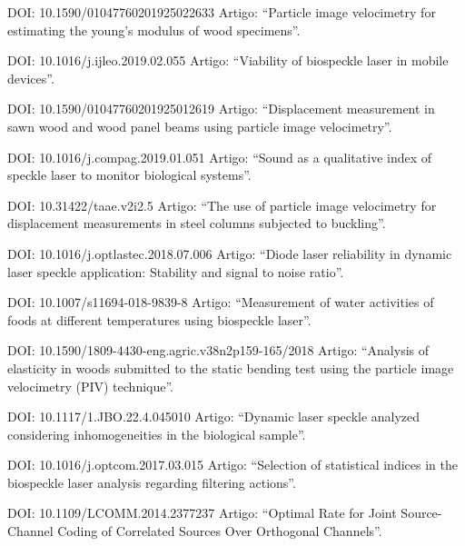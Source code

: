 \documentclass[11pt,a4paper,sans]{moderncv} %
\begin{document}
	      {DOI: 10.1590/01047760201925022633}{}{}
	      {Artigo: ``Particle image velocimetry for estimating the young’s modulus of wood specimens''.}

	      {DOI: 10.1016/j.ijleo.2019.02.055}{}{}
	      {Artigo: ``Viability of biospeckle laser in mobile devices''.}

	      {DOI: 10.1590/01047760201925012619}{}{}
	      {Artigo: ``Displacement measurement in sawn wood and wood panel beams using particle image velocimetry''.}

	      {DOI: 10.1016/j.compag.2019.01.051}{}{}
	      {Artigo: ``Sound as a qualitative index of speckle laser to monitor biological systems''.}

	      {DOI: 10.31422/taae.v2i2.5}{}{}
	      {Artigo: ``The use of particle image velocimetry for displacement measurements in steel columns subjected to buckling''.}
	      
	      {DOI: 10.1016/j.optlastec.2018.07.006}{}{}
	      {Artigo: ``Diode laser reliability in dynamic laser speckle application: Stability and signal to noise ratio''.}
	      
	      {DOI: 10.1007/s11694-018-9839-8}{}{}
	      {Artigo: ``Measurement of water activities of foods at different temperatures using biospeckle laser''.}

	      {DOI: 10.1590/1809-4430-eng.agric.v38n2p159-165/2018}{}{}
	      {Artigo: ``Analysis of elasticity in woods submitted to the static bending test using the particle image velocimetry (PIV) technique''.}

	      {DOI: 10.1117/1.JBO.22.4.045010}{}{}
	      {Artigo: ``Dynamic laser speckle analyzed considering inhomogeneities in the biological sample''.}
	      
	      {DOI: 10.1016/j.optcom.2017.03.015}{}{}
	      {Artigo: ``Selection of statistical indices in the biospeckle laser analysis regarding filtering actions''.}
	      
	      {DOI: 10.1109/LCOMM.2014.2377237}{}{}
	      {Artigo: ``Optimal  Rate for Joint Source-Channel Coding of Correlated Sources Over Orthogonal Channels''.}
\end{document}
